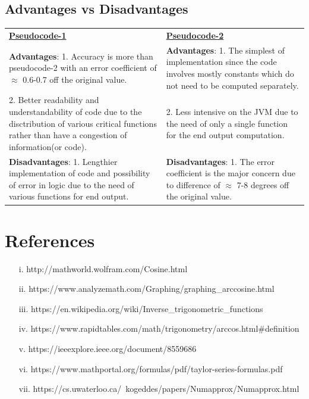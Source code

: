 \documentclass[12pt]{report}
\begin{document}
	\subsection{Advantages vs Disadvantages}
	\begin{center}
		\begin{tabular}{p{8cm}|p{8cm}}
			\textbf{\underline{Pseudocode-1}}&\textbf{\underline{Pseudocode-2}}\\
			\textbf{Advantages}: 1. Accuracy is more than pseudocode-2 with an error coefficient of $\approx$ 0.6-0.7 off the original value. &\textbf{Advantages}: 1. The simplest of implementation since the code involves mostly constants which do not need to be computed separately.\\
			2. Better readability and understandability of code due to the disctribution of various critical functions rather than have a congestion of information(or code).&2. Less intensive on the JVM due to the need of only a single function for the end output computation.\\
			\textbf{Disadvantages}: 1. Lengthier implementation of code and possibility of error in logic due to the need of various functions for end output.&\textbf{Disadvantages}: 1. The error coefficient is the major concern due to difference of $\approx$ 7-8 degrees off the original value.
		\end{tabular}
	\end{center}

\section{References}
\begin{enumerate}
	\item[i.] http://mathworld.wolfram.com/Cosine.html
	\item[ii.] https://www.analyzemath.com/Graphing/graphing\_arccosine.html
	\item[iii.] https://en.wikipedia.org/wiki/Inverse\_trigonometric\_functions
	\item[iv.] https://www.rapidtables.com/math/trigonometry/arccos.html\#definition
	\item[v.] https://ieeexplore.ieee.org/document/8559686
	\item[vi.] https://www.mathportal.org/formulas/pdf/taylor-series-formulas.pdf
	\item[vii.] https://cs.uwaterloo.ca/~kogeddes/papers/Numapprox/Numapprox.html
\end{enumerate}
		
	
\end{document}
